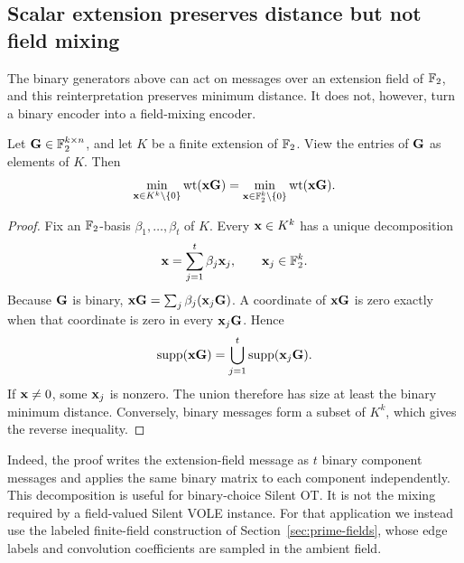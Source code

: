 \subsection{Scalar extension preserves distance but not field mixing}

The binary generators above can act on messages over an extension field of
$\mathbb F_2$, and this reinterpretation preserves minimum distance.  It does not,
however, turn a binary encoder into a field-mixing encoder.

\begin{lemma}
\label{lem:binary-scalar-extension}
Let $\mathbf G\in\mathbb F_2^{k\times n}$, and let $K$ be a finite extension of $\mathbb F_2$.
View the entries of $\mathbf G$ as elements of $K$.  Then
\begin{equation}
 \min_{\mathbf x\in K^k\setminus\{0\}}\operatorname{wt}(\mathbf x\mathbf G)
 =
 \min_{\mathbf x\in\mathbb F_2^k\setminus\{0\}}\operatorname{wt}(\mathbf x\mathbf G).
 \label{eq:binary-scalar-extension-distance}
\end{equation}
\end{lemma}

\begin{proof}
Fix an $\mathbb F_2$-basis $\beta_1,\ldots,\beta_t$ of $K$.  Every
$\mathbf x\in K^k$ has a unique decomposition
\begin{equation*}
 \mathbf x=\sum_{j=1}^{t}\beta_j\mathbf x_j,
 \qquad \mathbf x_j\in\mathbb F_2^k.
\end{equation*}
Because $\mathbf G$ is binary,
$\mathbf x\mathbf G=\sum_j\beta_j(\mathbf x_j\mathbf G)$.  A coordinate of $\mathbf x\mathbf G$ is zero exactly when
that coordinate is zero in every $\mathbf x_j\mathbf G$.  Hence
\begin{equation*}
 \operatorname{supp}(\mathbf x\mathbf G)=\bigcup_{j=1}^{t}\operatorname{supp}(\mathbf x_j\mathbf G).
\end{equation*}
If $\mathbf x\ne0$, some $\mathbf x_j$ is nonzero.  The union therefore has size at least
the binary minimum distance.  Conversely, binary messages form a subset of
$K^k$, which gives the reverse inequality.
\end{proof}

Indeed, the proof writes the extension-field message as $t$ binary component
messages and applies the same binary matrix to each component independently.
This decomposition is useful for binary-choice Silent OT.  It is not the
mixing required by a field-valued Silent VOLE instance.  For that application
we instead use the labeled finite-field construction of
Section~\ref{sec:prime-fields}, whose edge labels and convolution coefficients
are sampled in the ambient field.
